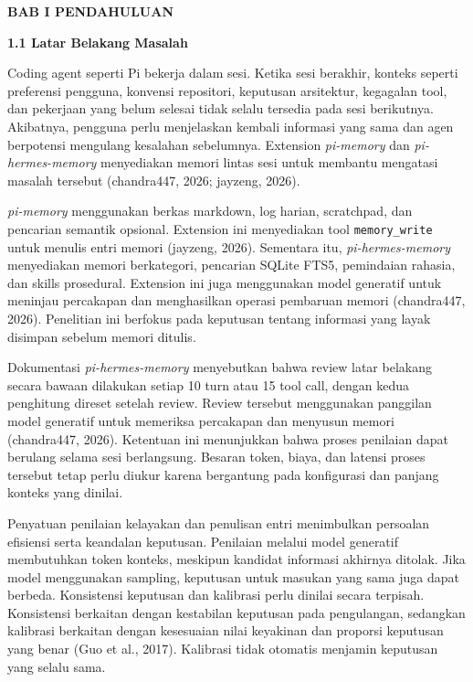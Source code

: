 \documentclass[
]{article}
\begin{document}
\clearpage
{}

\textbf{BAB I PENDAHULUAN}\label{sec:bab1}

\textbf{1.1 Latar Belakang Masalah}\label{sec:1.1}

Coding agent seperti Pi bekerja dalam sesi. Ketika sesi berakhir, konteks seperti preferensi pengguna, konvensi repositori, keputusan arsitektur, kegagalan tool, dan pekerjaan yang belum selesai tidak selalu tersedia pada sesi berikutnya. Akibatnya, pengguna perlu menjelaskan kembali informasi yang sama dan agen berpotensi mengulang kesalahan sebelumnya. Extension \emph{pi-memory} dan \emph{pi-hermes-memory} menyediakan memori lintas sesi untuk membantu mengatasi masalah tersebut (chandra447, 2026; jayzeng, 2026).

\emph{pi-memory} menggunakan berkas markdown, log harian, scratchpad, dan pencarian semantik opsional. Extension ini menyediakan tool \texttt{memory\_write} untuk menulis entri memori (jayzeng, 2026). Sementara itu, \emph{pi-hermes-memory} menyediakan memori berkategori, pencarian SQLite FTS5, pemindaian rahasia, dan skills prosedural. Extension ini juga menggunakan model generatif untuk meninjau percakapan dan menghasilkan operasi pembaruan memori (chandra447, 2026). Penelitian ini berfokus pada keputusan tentang informasi yang layak disimpan sebelum memori ditulis.

Dokumentasi \emph{pi-hermes-memory} menyebutkan bahwa review latar belakang secara bawaan dilakukan setiap 10 turn atau 15 tool call, dengan kedua penghitung direset setelah review. Review tersebut menggunakan panggilan model generatif untuk memeriksa percakapan dan menyusun memori (chandra447, 2026). Ketentuan ini menunjukkan bahwa proses penilaian dapat berulang selama sesi berlangsung. Besaran token, biaya, dan latensi proses tersebut tetap perlu diukur karena bergantung pada konfigurasi dan panjang konteks yang dinilai.

Penyatuan penilaian kelayakan dan penulisan entri menimbulkan persoalan efisiensi serta keandalan keputusan. Penilaian melalui model generatif membutuhkan token konteks, meskipun kandidat informasi akhirnya ditolak. Jika model menggunakan sampling, keputusan untuk masukan yang sama juga dapat berbeda. Konsistensi keputusan dan kalibrasi perlu dinilai secara terpisah. Konsistensi berkaitan dengan kestabilan keputusan pada pengulangan, sedangkan kalibrasi berkaitan dengan kesesuaian nilai keyakinan dan proporsi keputusan yang benar (Guo et al., 2017). Kalibrasi tidak otomatis menjamin keputusan yang selalu sama.
\end{document}
